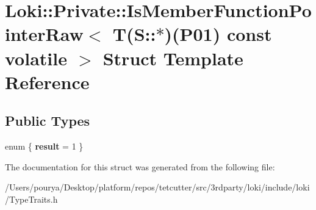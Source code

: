 \hypertarget{structLoki_1_1Private_1_1IsMemberFunctionPointerRaw_3_01T_07S_1_1_5_08_07P01_08_01const_01volatile_01_4}{}\section{Loki\+:\+:Private\+:\+:Is\+Member\+Function\+Pointer\+Raw$<$ T(S\+:\+:$\ast$)(P01) const volatile $>$ Struct Template Reference}
\label{structLoki_1_1Private_1_1IsMemberFunctionPointerRaw_3_01T_07S_1_1_5_08_07P01_08_01const_01volatile_01_4}
\subsection*{Public Types}
\begin{DoxyCompactItemize}
\item 
\hypertarget{structLoki_1_1Private_1_1IsMemberFunctionPointerRaw_3_01T_07S_1_1_5_08_07P01_08_01const_01volatile_01_4_aeb17a6e4fea97b3d602ad3c580b4d140}{}enum \{ {\bfseries result} = 1
 \}\label{structLoki_1_1Private_1_1IsMemberFunctionPointerRaw_3_01T_07S_1_1_5_08_07P01_08_01const_01volatile_01_4_aeb17a6e4fea97b3d602ad3c580b4d140}

\end{DoxyCompactItemize}


The documentation for this struct was generated from the following file\+:\begin{DoxyCompactItemize}
\item 
/\+Users/pourya/\+Desktop/platform/repos/tetcutter/src/3rdparty/loki/include/loki/Type\+Traits.\+h\end{DoxyCompactItemize}
